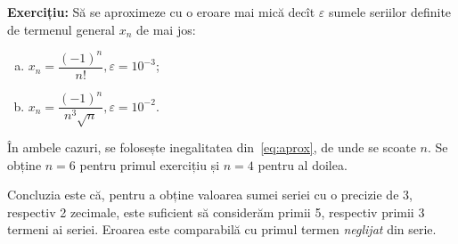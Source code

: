 \textbf{Exercițiu:} Să se aproximeze cu o eroare mai mică decît $ \varepsilon $
sumele seriilor definite de termenul general $ x_n $ de mai jos:
\begin{enumerate}[(a)]
    \item $ x_n = \dfrac{(-1)^n}{n!}, \varepsilon = 10^{-3} $;
    \item $ x_n = \dfrac{(-1)^n}{n^3 \sqrt{n}}, \varepsilon = 10^{-2} $.
\end{enumerate}

În ambele cazuri, se folosește inegalitatea din~\eqref{eq:aprox}, de unde se 
scoate $ n $. Se obține $ n = 6 $ pentru primul exercițiu și $ n = 4 $ pentru
al doilea.

Concluzia este că, pentru a obține valoarea sumei seriei cu o precizie de 3, respectiv
2 zecimale, este suficient să considerăm primii 5, respectiv primii 3 termeni ai seriei. 
Eroarea este comparabilă cu primul termen \emph{neglijat} din serie.
